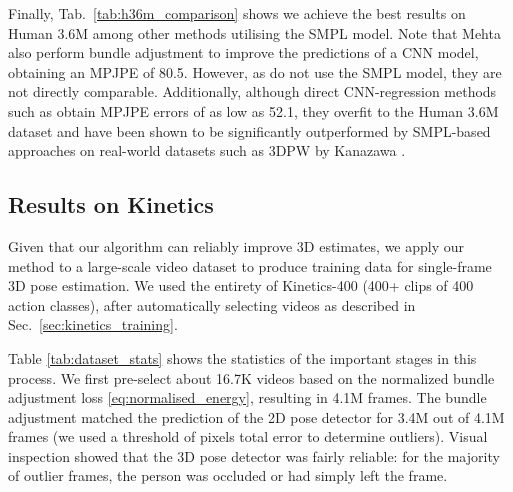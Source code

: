 \documentclass[10pt,twocolumn,letterpaper]{article}
\begin{document}
Finally, Tab.~\ref{tab:h36m_comparison} shows we achieve the best results on Human 3.6M among other methods utilising the SMPL model.
Note that Mehta \etal \cite{mehta_tog_2017} also perform bundle adjustment to improve the predictions of a CNN model, obtaining an MPJPE of 80.5.
However, as \cite{mehta_tog_2017} do not use the SMPL model, they are not directly comparable.
Additionally, although direct CNN-regression methods such as \cite{dabral_eccv_2018} obtain MPJPE errors of as low as 52.1, they overfit to the Human 3.6M dataset and have been shown to be significantly outperformed by SMPL-based approaches on real-world datasets such as 3DPW \cite{von_marcard_eccv_2018} by Kanazawa \etal \cite{kanazawa_cvpr_2019}.


\subsection{Results on Kinetics}
\label{sec:exp_kinetics}
Given that our algorithm can reliably improve 3D estimates, we apply our method to a large-scale video dataset to produce training data for single-frame 3D pose estimation.
We used the entirety of Kinetics-400 \cite{kay_arxiv_2017} (400+ clips of 400 action classes), after automatically selecting videos as described in Sec.~\ref{sec:kinetics_training}.

Table \ref{tab:dataset_stats} shows the statistics of the important stages in this process. 
We first pre-select about 16.7K videos based on the normalized bundle adjustment loss \eqref{eq:normalised_energy}, resulting in 4.1M frames. 
The bundle adjustment matched the prediction of the 2D pose detector \cite{papandreou_cvpr_2017} for 3.4M out of 4.1M frames (we used a threshold of  pixels total error to determine outliers). 
Visual inspection showed that the 3D pose detector was fairly reliable: for the majority of outlier frames, the person was occluded or had simply left the frame.
\end{document}

